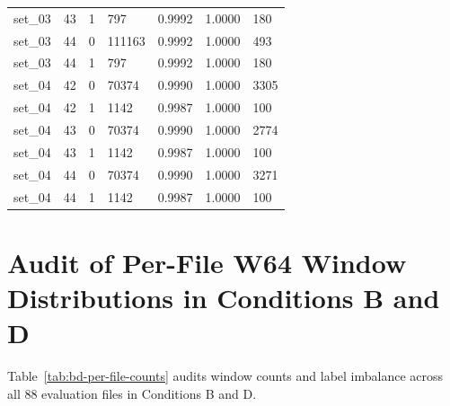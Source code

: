 \documentclass[12pt, a4paper, reqno, oneside]{book}
\begin{document}
{\begin{longtable}{P{1.5cm}P{1.0cm}P{1.2cm}P{1.8cm}P{1.7cm}P{1.7cm}P{2.2cm}}
set\_03 & 43 & 1 & 797 & 0.9992 & 1.0000 & 180\\
set\_03 & 44 & 0 & 111163 & 0.9992 & 1.0000 & 493\\
set\_03 & 44 & 1 & 797 & 0.9992 & 1.0000 & 180\\
set\_04 & 42 & 0 & 70374 & 0.9990 & 1.0000 & 3305\\
set\_04 & 42 & 1 & 1142 & 0.9987 & 1.0000 & 100\\
set\_04 & 43 & 0 & 70374 & 0.9990 & 1.0000 & 2774\\
set\_04 & 43 & 1 & 1142 & 0.9987 & 1.0000 & 100\\
set\_04 & 44 & 0 & 70374 & 0.9990 & 1.0000 & 3271\\
set\_04 & 44 & 1 & 1142 & 0.9987 & 1.0000 & 100\\
\bottomrule\end{longtable}}

\section{Audit of Per-File W64 Window Distributions in Conditions B and D}\label{sec:app-bd-per-file-counts}
Table~\ref{tab:bd-per-file-counts} audits window counts and label imbalance across all 88 evaluation files in Conditions B and D.
\end{document}
